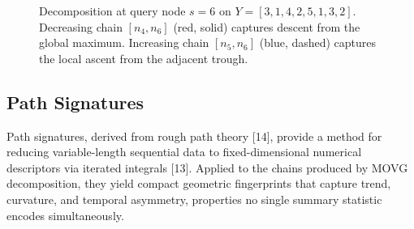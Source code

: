 \documentclass[a4paper,12pt]{article}
\begin{document}
\begin{figure}[H]
    \centering
    \caption{Decomposition at query node $s{=}6$ on $Y = [3, 1, 4, 2, 5, 1, 3, 2]$. Decreasing chain $[n_4, n_6]$ (red, solid) captures descent from the global maximum. Increasing chain $[n_5, n_6]$ (blue, dashed) captures the local ascent from the adjacent trough.}
    \label{fig:decomposition-example}
\end{figure}

\subsection{Path Signatures}
\label{sec:signatures}

Path signatures, derived from rough path theory [14], provide a method for reducing variable-length sequential data to fixed-dimensional numerical descriptors via iterated integrals [13]. Applied to the chains produced by MOVG decomposition, they yield compact geometric fingerprints that capture trend, curvature, and temporal asymmetry, properties no single summary statistic encodes simultaneously.
\end{document}
